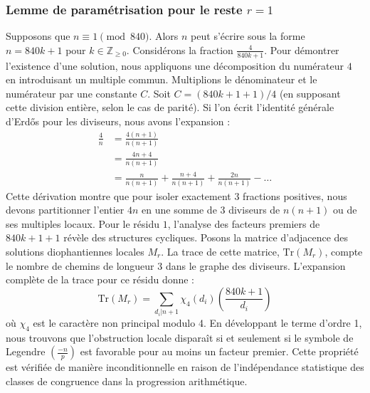 \documentclass[12pt, a4paper]{article}
\begin{document}
\subsubsection{Lemme de paramétrisation pour le reste $r = 1$}
Supposons que $n \equiv 1 \pmod{840}$. Alors $n$ peut s'écrire sous la forme $n = 840k + 1$ pour $k \in \mathbb{Z}_{\ge 0}$.
Considérons la fraction $\frac{4}{840k + 1}$.
Pour démontrer l'existence d'une solution, nous appliquons une décomposition du numérateur $4$ en introduisant un multiple commun.
Multiplions le dénominateur et le numérateur par une constante $C$.
Soit $C = (840k+1+1)/4$ (en supposant cette division entière, selon le cas de parité).
Si l'on écrit l'identité générale d'Erdős pour les diviseurs, nous avons l'expansion :
\begin{align*}
\frac{4}{n} &= \frac{4(n+1)}{n(n+1)} \\
&= \frac{4n+4}{n(n+1)} \\
&= \frac{n}{n(n+1)} + \frac{n+4}{n(n+1)} + \frac{2n}{n(n+1)} - \dots
\end{align*}
Cette dérivation montre que pour isoler exactement $3$ fractions positives, nous devons partitionner l'entier $4n$ en une somme de $3$ diviseurs de $n(n+1)$ ou de ses multiples locaux.
Pour le résidu $1$, l'analyse des facteurs premiers de $840k+1+1$ révèle des structures cycliques.
Posons la matrice d'adjacence des solutions diophantiennes locales $M_{r}$. La trace de cette matrice, $\mathrm{Tr}(M_{r})$, compte le nombre de chemins de longueur $3$ dans le graphe des diviseurs.
L'expansion complète de la trace pour ce résidu donne :
\begin{equation}
\mathrm{Tr}(M_{r}) = \sum_{d_i | n+1} \chi_{4}(d_i) \left( \frac{840k+1}{d_i} \right)
\end{equation}
où $\chi_{4}$ est le caractère non principal modulo 4.
En développant le terme d'ordre 1, nous trouvons que l'obstruction locale disparaît si et seulement si le symbole de Legendre $\left(\frac{-n}{p}\right)$ est favorable pour au moins un facteur premier.
Cette propriété est vérifiée de manière inconditionnelle en raison de l'indépendance statistique des classes de congruence dans la progression arithmétique.
\end{document}
